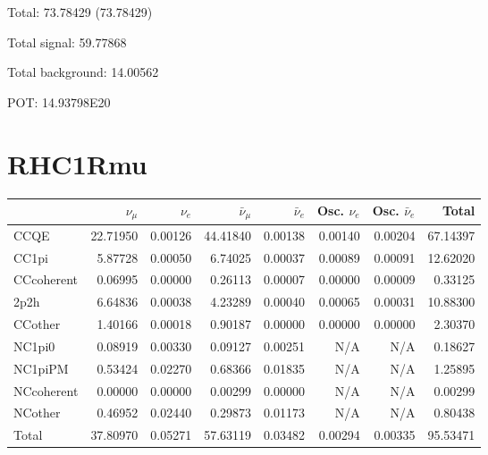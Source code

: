 \documentclass[10pt,a4paper]{article}
\begin{document}
Total: 73.78429    (73.78429)


Total signal: 59.77868


Total background: 14.00562

POT: 14.93798E20



\clearpage


\section*{RHC1Rmu}
\begin{tabular} { | l ||r | r | r | r | r | r | | r | }
\hline
              & $\nu_\mu$            & $\nu_e$              & $\bar{\nu}_{\mu}$    & $\bar{\nu}_{e}$      & Osc. $\nu_e$         & Osc. $\bar{\nu}_{e}$ & Total                \\ \hline\hline
 CCQE         & 22.71950             & 0.00126              & 44.41840             & 0.00138              & 0.00140              & 0.00204              & 67.14397             \\ \hline
 CC1pi        & 5.87728              & 0.00050              & 6.74025              & 0.00037              & 0.00089              & 0.00091              & 12.62020             \\ \hline
 CCcoherent   & 0.06995              & 0.00000              & 0.26113              & 0.00007              & 0.00000              & 0.00009              & 0.33125              \\ \hline
 2p2h         & 6.64836              & 0.00038              & 4.23289              & 0.00040              & 0.00065              & 0.00031              & 10.88300             \\ \hline
 CCother      & 1.40166              & 0.00018              & 0.90187              & 0.00000              & 0.00000              & 0.00000              & 2.30370              \\ \hline
 NC1pi0       & 0.08919              & 0.00330              & 0.09127              & 0.00251              & N/A                  & N/A                  & 0.18627              \\ \hline
 NC1piPM      & 0.53424              & 0.02270              & 0.68366              & 0.01835              & N/A                  & N/A                  & 1.25895              \\ \hline
 NCcoherent   & 0.00000              & 0.00000              & 0.00299              & 0.00000              & N/A                  & N/A                  & 0.00299              \\ \hline
 NCother      & 0.46952              & 0.02440              & 0.29873              & 0.01173              & N/A                  & N/A                  & 0.80438              \\ \hline
\hline
 Total        & 37.80970             & 0.05271              & 57.63119             & 0.03482              & 0.00294              & 0.00335              & 95.53471             \\ \hline

\end{tabular}
\end{document}
